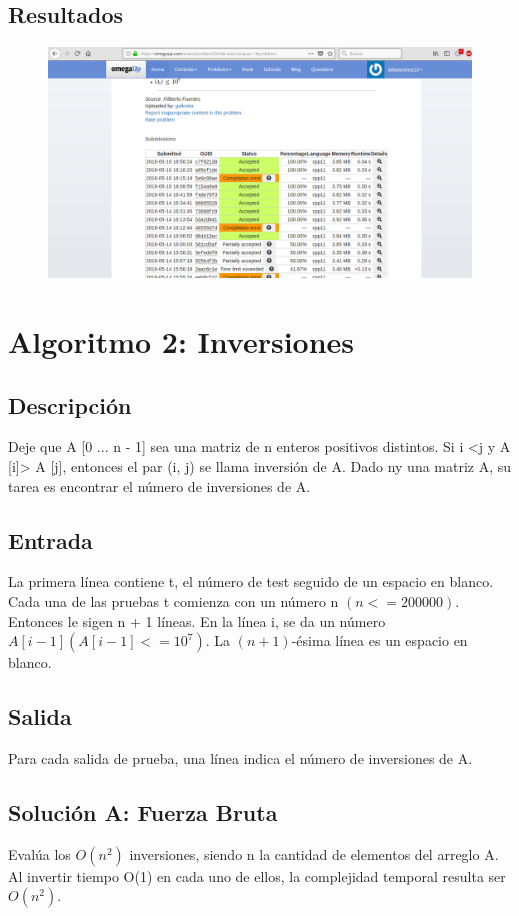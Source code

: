 \documentclass[12pt, fleqn]{article}                             %
\theoremstyle{break}                                            %
\begin{document}
\subsection{Resultados}
\begin{figure}[H]
               \centering
                \includegraphics[scale=.5]{DV1}
            \end{figure}


\section{Algoritmo 2: Inversiones}
\subsection{Descripción}
Deje que A [0 ... n - 1] sea una matriz de n enteros positivos distintos. Si i <j y A [i]> A [j], entonces el par (i, j) se llama inversión de A. Dado ny una matriz A, su tarea es encontrar el número de inversiones de A.

\subsection{Entrada}
La primera línea contiene t, el número de test seguido de un espacio en blanco. Cada una de las pruebas t comienza con un número n $(n <= 200000)$. Entonces le sigen n + 1 líneas. En la línea i, se da un número $A [i - 1] (A [i - 1] <= 10 ^ 7)$. La $(n + 1)$-ésima línea  es un espacio en blanco.
\subsection{Salida}

Para cada salida de prueba, una línea indica el número de inversiones de A.


\subsection{Solución A: Fuerza Bruta}
Evalúa los $O(n^2)$ inversiones, siendo n
la cantidad de elementos del arreglo A. Al invertir tiempo O(1) en cada uno
de ellos, la complejidad temporal resulta ser $O(n^2)$. 
\end{document}
